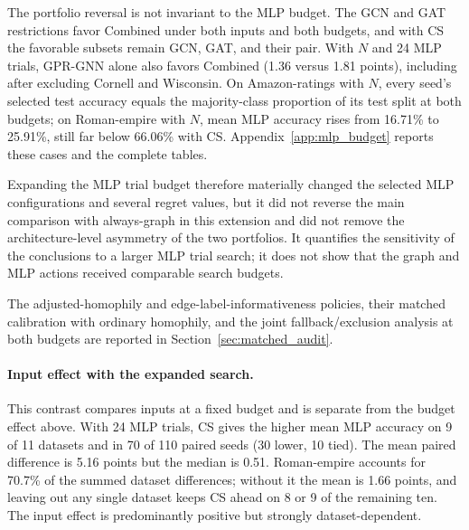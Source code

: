 The portfolio reversal is not invariant to the MLP budget. The GCN and GAT restrictions favor Combined under both inputs and both budgets, and with CS the favorable subsets remain GCN, GAT, and their pair. With $N$ and 24 MLP trials, GPR-GNN alone also favors Combined (1.36 versus 1.81 points), including after excluding Cornell and Wisconsin. On Amazon-ratings with $N$, every seed's selected test accuracy equals the majority-class proportion of its test split at both budgets; on Roman-empire with $N$, mean MLP accuracy rises from 16.71\% to 25.91\%, still far below 66.06\% with CS. Appendix~\ref{app:mlp_budget} reports these cases and the complete tables.

Expanding the MLP trial budget therefore materially changed the selected MLP configurations and several regret values, but it did not reverse the main comparison with always-graph in this extension and did not remove the architecture-level asymmetry of the two portfolios. It quantifies the sensitivity of the conclusions to a larger MLP trial search; it does not show that the graph and MLP actions received comparable search budgets.

The adjusted-homophily and edge-label-informativeness policies, their matched calibration with ordinary homophily, and the joint fallback/exclusion analysis at both budgets are reported in Section~\ref{sec:matched_audit}.

\paragraph{Input effect with the expanded search.}
This contrast compares inputs at a fixed budget and is separate from the budget effect above. With 24 MLP trials, CS gives the higher mean MLP accuracy on 9 of 11 datasets and in 70 of 110 paired seeds (30 lower, 10 tied). The mean paired difference is 5.16 points but the median is 0.51. Roman-empire accounts for 70.7\% of the summed dataset differences; without it the mean is 1.66 points, and leaving out any single dataset keeps CS ahead on 8 or 9 of the remaining ten. The input effect is predominantly positive but strongly dataset-dependent.

